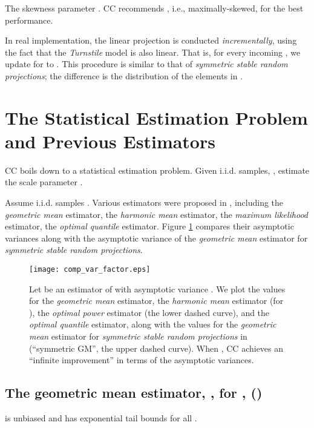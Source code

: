 \documentclass[oneside,10pt]{article}
\begin{document}
The skewness parameter . CC recommends  , i.e., maximally-skewed, for the best performance.

In real implementation, the linear projection  is conducted {\em incrementally}, using the fact that the {\em Turnstile} model is also linear. That is, for every incoming , we update  for  to .   This procedure is similar to that of {\em symmetric stable random projections}\cite{Article:Indyk_JACM06,Proc:Li_SODA08}; the difference is the distribution of the elements in .

\section{The Statistical Estimation Problem and Previous Estimators}

CC boils down to a statistical estimation problem. Given  i.i.d. samples, , estimate the scale parameter .

Assume  i.i.d. samples . Various estimators were proposed in \cite{Article:Li_CC,Article:Li_CC_v0}, including the {\em geometric mean} estimator, the {\em harmonic mean} estimator, the {\em maximum likelihood} estimator, the {\em optimal quantile} estimator. Figure \ref{fig_comp_var_factor} compares their asymptotic variances along with the asymptotic variance of the {\em geometric mean} estimator for {\em symmetric stable random projections}\cite{Proc:Li_SODA08}.



\begin{figure}[h]
\begin{center}
\texttt{[image: comp\_var\_factor.eps]}
\end{center}
\vspace{-0.3in}
\caption{Let  be an estimator of  with asymptotic variance . We plot the  values for the {\em geometric mean} estimator,  the {\em harmonic mean} estimator (for ), the {\em optimal power} estimator (the lower dashed curve), and the {\em optimal quantile} estimator, along with the  values for the {\em geometric mean} estimator for {\em symmetric stable random projections} in \cite{Proc:Li_SODA08} (``symmetric GM'', the upper dashed curve). When , CC achieves an ``infinite improvement'' in terms of the asymptotic variances.
}\label{fig_comp_var_factor}
\end{figure}


\subsection{The geometric mean estimator, , for ,  ()}
 is unbiased and has exponential tail bounds for all .
\end{document}
